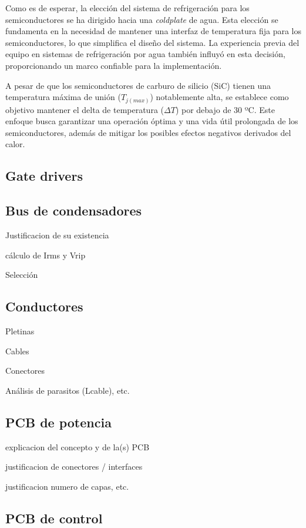 Como es de esperar, la elección del sistema de refrigeración para los semiconductores se ha dirigido hacia una \textit{coldplate} de agua. Esta elección se fundamenta en la necesidad de mantener una interfaz de temperatura fija para los semiconductores, lo que simplifica el diseño del sistema. La experiencia previa del equipo en sistemas de refrigeración por agua también influyó en esta decisión, proporcionando un marco confiable para la implementación.

A pesar de que los semiconductores de carburo de silicio (SiC) tienen una temperatura máxima de unión (\(T_{j(max)}\)) notablemente alta, se establece como objetivo mantener el delta de temperatura (\(\Delta T\)) por debajo de 30 ºC. Este enfoque busca garantizar una operación óptima y una vida útil prolongada de los semiconductores, además de mitigar los posibles efectos negativos derivados del calor.

\subsection{Gate drivers}



\subsection{Bus de condensadores}

Justificacion de su existencia

cálculo de Irms y Vrip

Selección

\subsection{Conductores}

Pletinas

Cables

Conectores

Análisis de parasitos (Lcable), etc.

\subsection{PCB de potencia}

explicacion del concepto y de la(s) PCB

justificacion de conectores / interfaces

justificacion numero de capas, etc.

\subsection{PCB de control}

